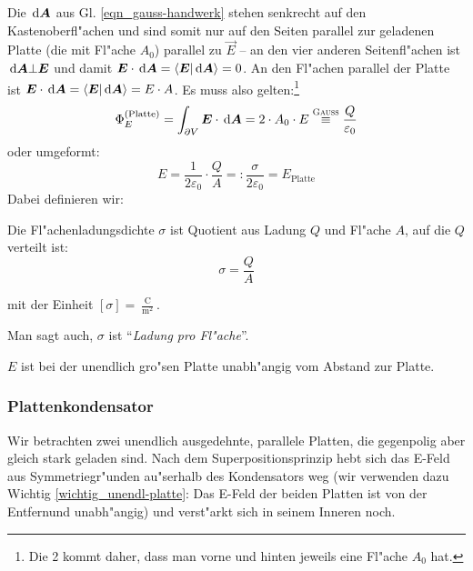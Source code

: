 Die $\, \mathrm{d} \boldsymbol{A}$ aus Gl. \eqref{eqn_gauss-handwerk} stehen senkrecht
auf den Kastenoberfl"achen und sind somit nur auf den Seiten parallel
zur geladenen Platte (die mit Fl"ache $A_0$) parallel zu $\vec E$ -- an
den vier anderen Seitenfl"achen ist $\, \mathrm{d} \boldsymbol{A} \bot \boldsymbol{E}$ und
damit $\boldsymbol{E} \cdot \, \mathrm{d} \boldsymbol{A} = \langle \boldsymbol{E} | \, \mathrm{d} \boldsymbol{A}
\rangle = 0$. An den Fl"achen parallel der Platte ist $\boldsymbol{E} \cdot
\, \mathrm{d} \boldsymbol{A} = \langle \boldsymbol{E} | \, \mathrm{d} \boldsymbol{A} \rangle = E \cdot A$. Es
muss also gelten:\footnote{Die 2 kommt daher, dass man vorne und
  hinten jeweils eine Fl"ache $A_0$ hat.}
\begin{equation}
   \label{eq:196}
\Phi_E^{(\text{Platte})} =    \int_{\partial V} \boldsymbol{E} \cdot \, \mathrm{d} \boldsymbol{A} = 2 \cdot A_0 \cdot E
   \stackrel{\text{\textsc{Gauss}}}{\equiv} \frac{Q}{\varepsilon_0}
\end{equation}
oder umgeformt:
\begin{equation}
   \label{eqn_e_platte}
   E = \frac{1}{2\varepsilon_0} \cdot \frac{Q}{A} =:
\boxed{   \frac{\sigma}{2\varepsilon_0} = E_\text{Platte}}
\end{equation}
Dabei definieren wir:
\begin{Def}
Die Fl"achenladungsdichte $\sigma$ ist Quotient aus Ladung $Q$ und
Fl"ache $A$, auf die $Q$ verteilt ist:
\begin{equation}
   \label{eqn_differenz-c00}
   \sigma = \frac{Q}{A}
\end{equation}
\end{Def}
mit der Einheit $[\sigma] =
\frac{\operatorname{C}}{\operatorname{m^2}}$.

Man sagt auch, $\sigma$ ist "`\textit{Ladung pro Fl"ache}"'.

\begin{Wichtig}
\label{wichtig_unendl-platte}
   $E$ ist bei der unendlich gro"sen Platte unabh"angig vom Abstand zur Platte.
\end{Wichtig}





\subsubsection{Plattenkondensator}
\label{kap_plattenkondensator}

Wir betrachten zwei unendlich ausgedehnte, parallele Platten, die
gegenpolig aber gleich stark geladen sind. Nach dem
Superpositionsprinzip hebt sich das E-Feld aus Symmetriegr"unden
au"serhalb des Kondensators weg (wir verwenden dazu Wichtig
\ref{wichtig_unendl-platte}: Das E-Feld der beiden Platten ist von der
Entfernund unabh"angig) und verst"arkt sich in seinem Inneren noch.

